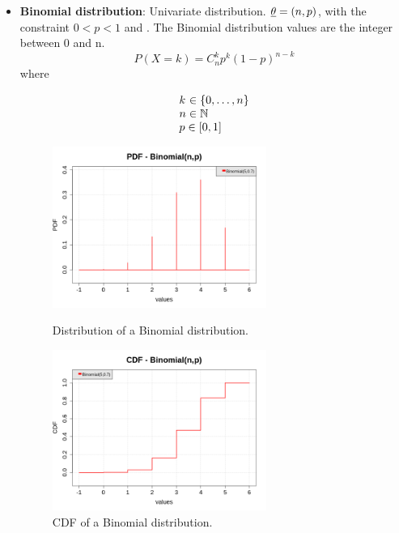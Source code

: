 {\begin{itemize}
\item {\bf Binomial distribution}: Univariate distribution. ${\underline{\theta}} = (n,p)$, with the constraint $0<p<1$ and . The Binomial distribution values are the integer between 0 and n.
\begin{equation}
\displaystyle P(X = k) = C_n^k p^k (1-p)^{{n-k}}
\end{equation}
where
\begin{equation}
\begin{array}{@{}l@{}}
k^{\strut} \in \{0, \hdots, n\} \\
n \in \Nset \\
p \in [0,1]
\end{array}
\end{equation}



\begin{figure}[H]
\begin{minipage}{8cm}
\begin{center}
\includegraphics[width=7cm]{Figures/pdf_Binomial.png}
\caption{Distribution of a Binomial distribution.}
\label{PDFBinomial}
\end{center}
\end{minipage}
\hfill
\begin{minipage}{8cm}
\begin{center}
\includegraphics[width=7cm]{Figures/cdf_Binomial.png}
\caption{CDF of a Binomial distribution.}
\label{CDFBinomial}
\end{center}
\end{minipage}
\end{figure}



\end{itemize}}
